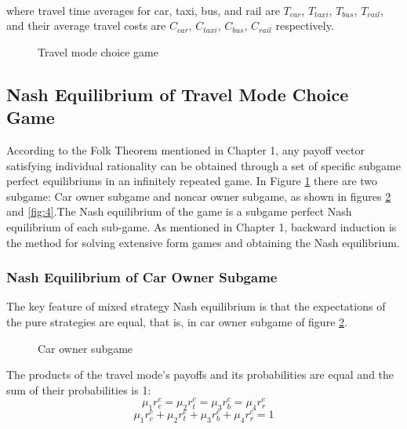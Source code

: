 \paragraph{}where travel time averages for car, taxi, bus, and rail are $T_{car}$, $T_{taxi}$, $T_{bus}$, $T_{rail}$, and their average travel costs are $C_{car}$, $C_{taxi}$, $C_{bus}$, $C_{rail}$ respectively.
\begin{figure}
 
  \centering
  \caption{Travel mode choice game\label{fig:555}}
\end{figure}
\subsection{Nash Equilibrium of Travel Mode Choice Game}
According to the Folk Theorem mentioned in Chapter 1, any payoff vector satisfying individual rationality can be obtained through a set of specific subgame perfect equilibriums in an infinitely repeated game. In Figure \ref{fig:555} there are two subgame: Car owner subgame and noncar owner subgame, as shown in figures \ref{fig:3} and \ref{fig:4}.The Nash equilibrium of the game is a subgame perfect Nash equilibrium of each sub-game. As mentioned in Chapter 1, backward induction is the method for solving extensive form games and obtaining the Nash equilibrium.

\subsubsection{Nash Equilibrium of Car Owner Subgame}The key feature of mixed strategy Nash equilibrium is that the expectations of the pure strategies are equal, that is, in car owner subgame of figure \ref{fig:3}. \\

\begin{figure}[!h]
  \centering
  \caption{Car owner subgame\label{fig:3}}
\end{figure}
The products of the travel mode's payoffs and its probabilities are equal and the sum of their probabilities is 1:
\begin{equation}\label{eq:8}
\mu_1 r^c_{c} = \mu_2 r^{c}_{t} = \mu_3 r^c_{b} = \mu_4 r^c_{r}
\end{equation}
\begin{equation}\label{eq:9}
\mu_1 r^c_{c} +  \mu_2 r^{c}_{t} + \mu_3 r^c_{b} + \mu_4 r^c_{r} = 1
\end{equation}

